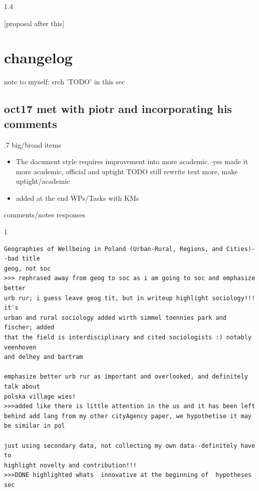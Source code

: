 \documentclass[10pt, letterpaper]{article}
\begin{document}
\begin{spacing}{1.4} %


{\huge[proposal after this]}

\section{changelog}note to myself: {\large \color{red}srch 'TODO' in this sec}\\

\subsection{oct17 met with piotr and incorporating his comments} 


\begin{spacing}{.7}
big/broad items
\begin{itemize}
\item  The document style requires improvement into more academic.--yes made it
  more academic, official and uptight TODO still rewrite text more, make uptight/academic
 \item added at the end WPs/Tasks with KMs
\end{itemize}
\end{spacing}

comments/notes responses
\begin{scriptsize}
\begin{spacing}{1} 
\begin{verbatim}
Geographies of Wellbeing in Poland (Urban-Rural, Regions, and Cities)--bad title
geog, not soc
>>> rephrased away from geog to soc as i am going to soc and emphasize better
urb rur; i guess leave geog tit, but in writeup highlight sociology!!! it's
urban and rural sociology added wirth simmel toennies park and fischer; added
that the field is interdisciplinary and cited sociologists :) notably veenhoven
and delhey and bartram

emphasize better urb rur as important and overlooked, and definitely talk about
polska village wies! 
>>>added like there is little attention in the us and it has been left
behind add lang from my other cityAgency paper, we hypothetise it may be similar in pol

just using secondary data, not collecting my own data--definitely have to
highlight novelty and contribution!!!
>>>DONE highlighted whats  innovative at the beginning of  hypotheses sec 


\end{verbatim}
\end{spacing}
\end{scriptsize}
\end{spacing}
\end{document}

